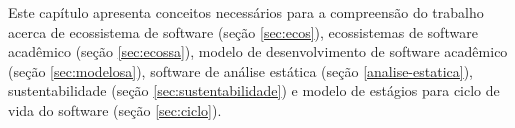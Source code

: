 \label{fundamentacao}

Este capítulo apresenta conceitos necessários para a compreensão do trabalho
acerca de ecossistema de software (seção \ref{sec:ecos}),
ecossistemas de software acadêmico (seção \ref{sec:ecossa}),
modelo de desenvolvimento de software acadêmico (seção \ref{sec:modelosa}),
software de análise estática (seção \ref{analise-estatica}),
sustentabilidade (seção \ref{sec:sustentabilidade}) e modelo de estágios
para ciclo de vida do software (seção \ref{sec:ciclo}).





